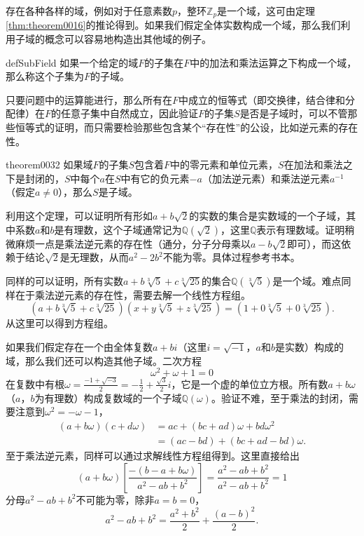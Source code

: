 存在各种各样的域，例如对于任意素数$p$，整环$\mathbb{Z}_p$是一个域，这可由定理\ref{thm:theorem0016}的推论得到。如果我们假定全体实数构成一个域，那么我们利用子域的概念可以容易地构造出其他域的例子。
\begin{definition}{}{defSubField}
如果一个给定的域$F$的子集在$F$中的加法和乘法运算之下构成一个域，那么称这个子集为$F$的子域。
\end{definition}

只要问题中的运算能进行，那么所有在$F$中成立的恒等式（即交换律，结合律和分配律）在$F$的任意子集中自然成立，因此验证$F$的子集$S$是否是子域时，可以不管那些恒等式的证明，而只需要检验那些包含某个“存在性”的公设，比如逆元素的存在性。
\begin{theorem}{}{theorem0032}
如果域$F$的子集$S$包含着$F$中的零元素和单位元素，$S$在加法和乘法之下是封闭的，$S$中每个$a$在$S$中有它的负元素$-a$（加法逆元素）和乘法逆元素$a^{-1}$（假定$a \neq 0$），那么$S$是子域。
\end{theorem}

利用这个定理，可以证明所有形如$a+b\sqrt{2}$的实数的集合是实数域的一个子域，其中系数$a$和$b$是有理数，这个子域通常记为$\mathbb{Q}(\sqrt{2})$，这里$\mathbb{Q}$表示有理数域。证明稍微麻烦一点是乘法逆元素的存在性（通分，分子分母乘以$a-b\sqrt{2}$即可），而这依赖于结论$\sqrt{2}$是无理数，从而$a^2-2b^2$不能为零。具体过程参考书本。

同样的可以证明，所有实数$a + b\sqrt[3]{5} + c\sqrt[3]{25}$的集合$\mathbb{Q}(\sqrt[3]{5})$是一个域。难点同样在于乘法逆元素的存在性，需要去解一个线性方程组。
\[
(a + b\sqrt[3]{5} + c\sqrt[3]{25})(x + y\sqrt[3]{5} + z\sqrt[3]{25}) = (1 + 0\sqrt[3]{5} + 0\sqrt[3]{25}).
\]
从这里可以得到方程组。

如果我们假定存在一个由全体复数$a+bi$（这里$i=\sqrt{-1}$，$a$和$b$是实数）构成的域，那么我们还可以构造其他子域。二次方程
\[
\omega^2 + \omega + 1 = 0
\]
在复数中有根$\omega = \frac{-1 + \sqrt{-3}}{2}=-\frac{1}{2}+\frac{\sqrt{3}}{2}i$，它是一个虚的单位立方根。所有数$a+b\omega$（$a$，$b$为有理数）构成复数域的一个子域$\mathbb{Q}(\omega)$。验证不难，至于乘法的封闭，需要注意到$\omega^2 = -\omega-1$，
\[
\begin{aligned}
(a+b\omega)(c+d\omega) &= ac + (bc+ad)\omega + bd\omega^2\\
&=(ac-bd) + (bc+ad-bd)\omega.
\end{aligned}
\]
至于乘法逆元素，同样可以通过求解线性方程组得到。这里直接给出
\[
(a+b\omega)[\frac{-(b-a+b\omega)}{a^2-ab+b^2}]=\frac{a^2-ab+b^2}{a^2-ab+b^2}=1
\]
分母$a^2-ab+b^2$不可能为零，除非$a=b=0$，
\[
a^2-ab+b^2 = \frac{a^2+b^2}{2} + \frac{(a-b)^2}{2}.
\]



